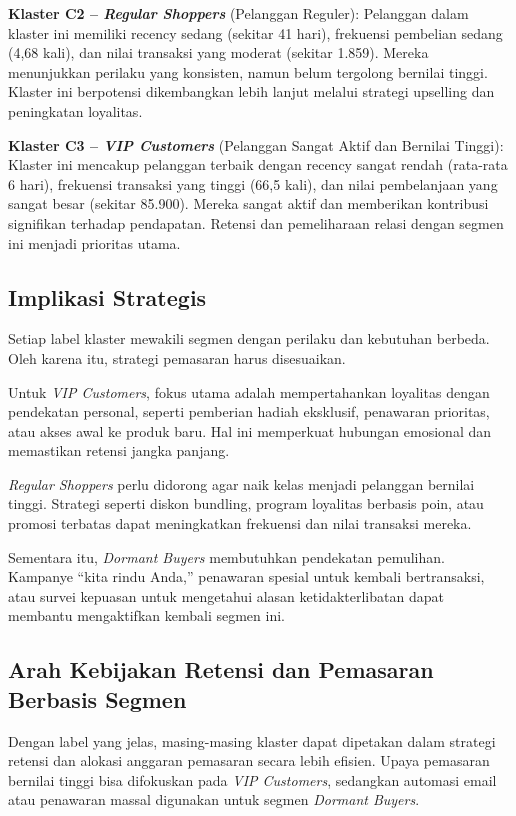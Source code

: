 \textbf{Klaster C2 – \textit{Regular Shoppers}} (Pelanggan Reguler):  
Pelanggan dalam klaster ini memiliki recency sedang (sekitar 41 hari), frekuensi pembelian sedang (4,68 kali), dan nilai transaksi yang moderat (sekitar 1.859). Mereka menunjukkan perilaku yang konsisten, namun belum tergolong bernilai tinggi. Klaster ini berpotensi dikembangkan lebih lanjut melalui strategi upselling dan peningkatan loyalitas.

\textbf{Klaster C3 – \textit{VIP Customers}} (Pelanggan Sangat Aktif dan Bernilai Tinggi):  
Klaster ini mencakup pelanggan terbaik dengan recency sangat rendah (rata-rata 6 hari), frekuensi transaksi yang tinggi (66,5 kali), dan nilai pembelanjaan yang sangat besar (sekitar 85.900). Mereka sangat aktif dan memberikan kontribusi signifikan terhadap pendapatan. Retensi dan pemeliharaan relasi dengan segmen ini menjadi prioritas utama.

\subsection{Implikasi Strategis}

Setiap label klaster mewakili segmen dengan perilaku dan kebutuhan berbeda. Oleh karena itu, strategi pemasaran harus disesuaikan.

Untuk \textit{VIP Customers}, fokus utama adalah mempertahankan loyalitas dengan pendekatan personal, seperti pemberian hadiah eksklusif, penawaran prioritas, atau akses awal ke produk baru. Hal ini memperkuat hubungan emosional dan memastikan retensi jangka panjang.

\textit{Regular Shoppers} perlu didorong agar naik kelas menjadi pelanggan bernilai tinggi. Strategi seperti diskon bundling, program loyalitas berbasis poin, atau promosi terbatas dapat meningkatkan frekuensi dan nilai transaksi mereka.

Sementara itu, \textit{Dormant Buyers} membutuhkan pendekatan pemulihan. Kampanye “kita rindu Anda,” penawaran spesial untuk kembali bertransaksi, atau survei kepuasan untuk mengetahui alasan ketidakterlibatan dapat membantu mengaktifkan kembali segmen ini.

\subsection{Arah Kebijakan Retensi dan Pemasaran Berbasis Segmen}

Dengan label yang jelas, masing-masing klaster dapat dipetakan dalam strategi retensi dan alokasi anggaran pemasaran secara lebih efisien. Upaya pemasaran bernilai tinggi bisa difokuskan pada \textit{VIP Customers}, sedangkan automasi email atau penawaran massal digunakan untuk segmen \textit{Dormant Buyers}.

